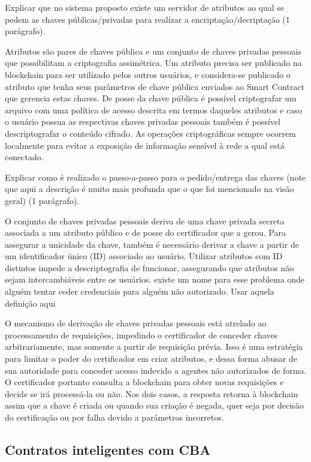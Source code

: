 \documentclass[a4paper,11pt]{article}
\begin{document}
{\color{ForestGreen}Explicar que no sistema proposto existe um servidor de atributos ao qual se pedem as chaves públicas/privadas para realizar a encriptação/decriptação (1 parágrafo).}

Atributos são pares de chaves pública e um conjunto de chaves privadas pessoais que possibilitam a criptografia assimétrica. Um atributo precisa ser publicado na blockchain para ser utilizado pelos outros usuários, e considera-se publicado o atributo que tenha seus parâmetros de chave pública enviados ao Smart Contract que gerencia estas chaves. De posse da chave pública é possível criptografar um arquivo com uma política de acesso descrita em termos daqueles atributos e caso o usuário possua as respectivas chaves privadas pessoais também é possível descriptografar o conteúdo cifrado. As operações criptográficas sempre ocorrem localmente para evitar a exposição de informação sensível à rede a qual está conectado.

{\color{ForestGreen}Explicar como é realizado o passo-a-passo para o pedido/entrega das chaves (note que aqui a descrição é muito mais profunda que o que foi mencionado na visão geral) (1 parágrafo).}

O conjunto de chaves privadas pessoais deriva de uma chave privada secreta associada a um atributo público e de posse do certificador que a gerou. Para assegurar a unicidade da chave, também é necessário derivar a chave a partir de um identificador único (ID) associado ao usuário. Utilizar atributos com ID distintos impede a descriptografia de funcionar, assegurando que atributos não sejam intercambiáveis entre os usuários. {\color{RoyalBlue} existe um nome para esse problema onde alguém tentar ceder credenciais para alguém não autorizado. Usar aquela definição aqui}

O mecanismo de derivação de chaves privadas pessoais está atrelado ao processamento de requisições, impedindo o certificador de conceder chaves arbitrariamente, mas somente a partir de requisição prévia. Isso é uma estratégia para limitar o poder do certificador em criar atributos, e dessa forma abusar de sua autoridade para conceder acesso indevido a agentes não autorizados de forma. O certificador portanto consulta a blockchain para obter novas requisições e decide se irá processá-la ou não. Nos dois casos, a resposta retorna à blockchain assim que a chave é criada ou quando sua criação é negada, quer seja por decisão do certificação ou por falha devido a parâmetros incorretos.


\subsection{Contratos inteligentes com CBA}
\end{document}
